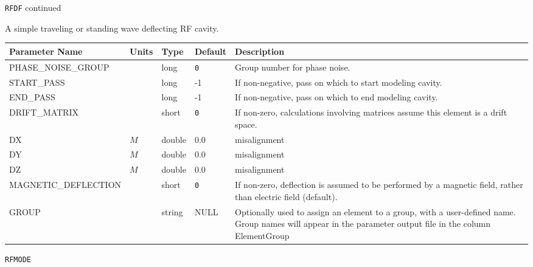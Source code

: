 \newpage
\begin{center}{\Large\verb|RFDF| continued}\end{center}
A simple traveling or standing wave deflecting RF cavity.
\\
\begin{tabular}{|l|l|l|l|p{\descwidth}|} \hline
Parameter Name & Units & Type & Default & Description \\ \hline 
PHASE\_NOISE\_GROUP &  & long &  \verb|0| & Group number for phase noise.  \\ \hline 
START\_PASS &  & long &   -1              & If non-negative, pass on which to start modeling cavity.  \\ \hline 
END\_PASS &  & long &   -1              & If non-negative, pass on which to end modeling cavity.  \\ \hline 
DRIFT\_MATRIX &  & short &  \verb|0| & If non-zero, calculations involving matrices assume this element is a drift space.  \\ \hline 
DX & $M$ & double &  0.0 & misalignment  \\ \hline 
DY & $M$ & double &  0.0 & misalignment  \\ \hline 
DZ & $M$ & double &  0.0 & misalignment  \\ \hline 
MAGNETIC\_DEFLECTION &  & short &  \verb|0| & If non-zero, deflection is assumed to be performed by a magnetic field, rather than electric field (default).  \\ \hline 
GROUP &  & string & NULL & Optionally used to assign an element to a group, with a user-defined name.  Group names will appear in the parameter output file in the column ElementGroup  \\ \hline 
\end{tabular}

\vspace*{0.5in}

\vspace*{0.5in}

\newpage
\begin{center}{\Large\verb|RFMODE|}\end{center}
